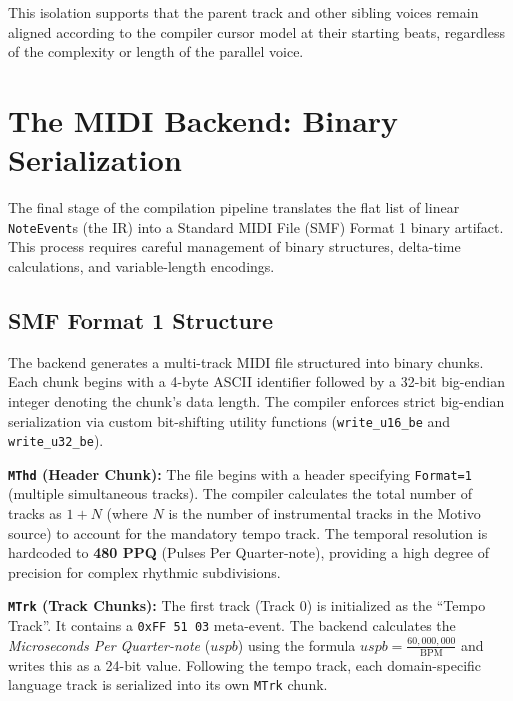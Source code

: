 This isolation supports that the parent track and other sibling voices remain aligned according to the
compiler cursor model at their starting
beats, regardless of the complexity or length of the parallel voice.


\section{The MIDI Backend: Binary Serialization}\label{detail-sec:implementation-backend}

The final stage of the compilation pipeline translates the flat list of linear \texttt{NoteEvent}s (the IR) into a
Standard MIDI File (SMF) Format 1 binary artifact.
This process requires careful management of binary structures, delta-time calculations, and variable-length encodings.

\subsection{SMF Format 1 Structure}\label{detail-subsec:smf-format-1-structure}

The backend generates a multi-track MIDI file structured into binary chunks.
Each chunk begins with a 4-byte ASCII identifier followed by a 32-bit big-endian integer denoting the chunk's data
length.
The compiler enforces strict big-endian serialization via custom bit-shifting utility functions (\texttt{write\_u16\_be}
and \texttt{write\_u32\_be}).

\noindent \textbf{\texttt{MThd} (Header Chunk):} The file begins with a header specifying \texttt{Format=1}
(multiple simultaneous tracks).
The compiler calculates the total number of tracks as $1 + N$ (where $N$ is the number of instrumental tracks in the
Motivo source) to account for the mandatory tempo track.
The temporal resolution is hardcoded to \textbf{480 PPQ} (Pulses Per Quarter-note), providing a high degree of
precision for complex rhythmic subdivisions.

\noindent \textbf{\texttt{MTrk} (Track Chunks):} The first track (Track 0) is initialized as the ``Tempo Track''.
It contains a \texttt{0xFF 51 03} meta-event.
The backend calculates the \textit{Microseconds Per Quarter-note} ($uspb$) using the formula $uspb =
\frac{60,000,000}{\mathrm{BPM}}$ and writes this as a 24-bit value.
Following the tempo track, each domain-specific language track is serialized into its own \texttt{MTrk} chunk.

